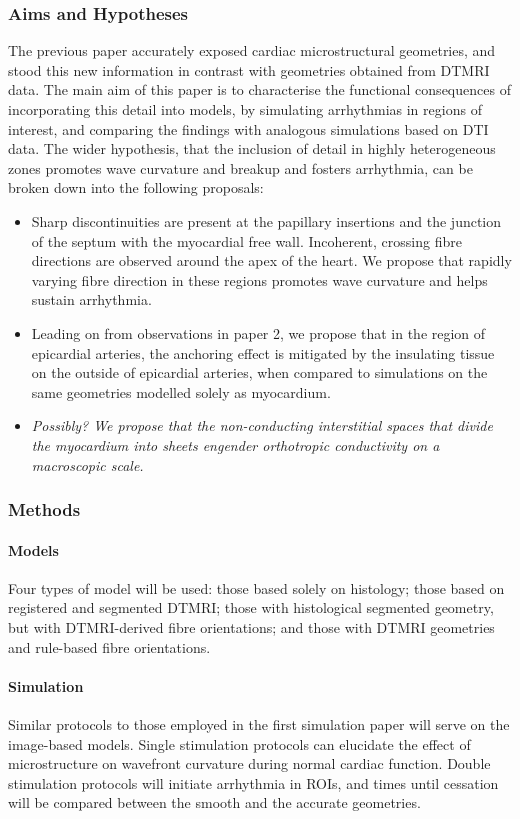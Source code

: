 \subsubsection{Aims and Hypotheses}
The previous paper accurately exposed cardiac microstructural geometries, and stood this new information in contrast with geometries obtained from DTMRI data. The main aim of this paper is to characterise the functional consequences of incorporating this detail into models, by simulating arrhythmias in regions of interest, and comparing the findings with analogous simulations based on DTI data. The wider hypothesis, that the inclusion of detail in highly heterogeneous zones promotes wave curvature and breakup and fosters arrhythmia, can be broken down into the following proposals:
\begin{itemize}
  \item Sharp discontinuities are present at the papillary insertions and the junction of the septum with the myocardial free wall. Incoherent, crossing fibre directions are observed around the apex of the heart. We propose that rapidly varying fibre direction in these regions promotes wave curvature and helps sustain arrhythmia.
  \item Leading on from observations in paper 2, we propose that in the region of epicardial arteries, the anchoring effect is mitigated by the insulating tissue on the outside of epicardial arteries, when compared to simulations on the same geometries modelled solely as myocardium.
  \item \emph{Possibly? We propose that the non-conducting interstitial spaces that divide the myocardium into sheets engender orthotropic conductivity on a macroscopic scale.}
\end{itemize}

\subsubsection{Methods}
\paragraph{Models}
Four types of model will be used: those based solely on histology; those based on registered and segmented DTMRI; those with histological segmented geometry, but with DTMRI-derived fibre orientations; and those with DTMRI geometries and rule-based fibre orientations.

\paragraph{Simulation}
  Similar protocols to those employed in the first simulation paper will serve on the image-based models. Single stimulation protocols can elucidate the effect of microstructure on wavefront curvature during normal cardiac function. Double stimulation protocols will initiate arrhythmia in ROIs, and times until cessation will be compared between the smooth and the accurate geometries.
  
